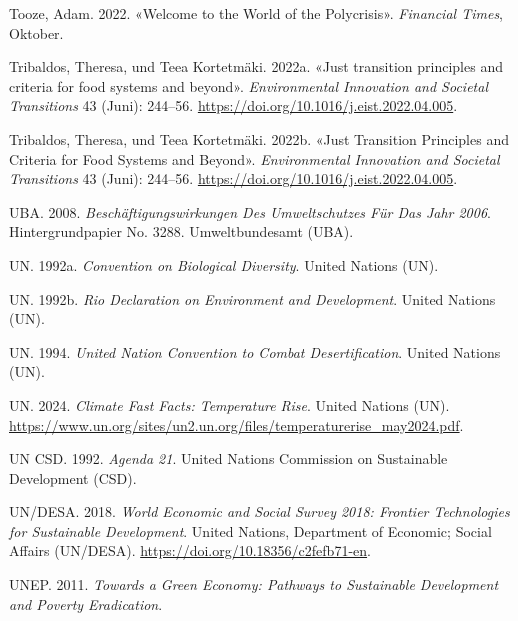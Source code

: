 \documentclass[
  nswissgerman,
  a4paper,
  openany]{book}
\newlength{\cslhangindent}
\newenvironment{CSLReferences}[2] %
 {\begin{list}{}{%
  \setlength{\itemindent}{0pt}
  \setlength{\leftmargin}{0pt}
  \setlength{\parsep}{0pt}
  \ifodd #1
   \setlength{\leftmargin}{\cslhangindent}
   \setlength{\itemindent}{-1\cslhangindent}
  \fi
  \setlength{\itemsep}{#2\baselineskip}}}
 {\end{list}}
\begin{document}
\begin{CSLReferences}{1}{1}
Tooze, Adam. 2022. {«Welcome to the World of the Polycrisis»}.
\emph{Financial Times}, Oktober.

Tribaldos, Theresa, und Teea Kortetmäki. 2022a. {«Just transition
principles and criteria for food systems and beyond»}.
\emph{Environmental Innovation and Societal Transitions} 43 (Juni):
244--56. \url{https://doi.org/10.1016/j.eist.2022.04.005}.

Tribaldos, Theresa, und Teea Kortetmäki. 2022b. {«Just Transition
Principles and Criteria for Food Systems and Beyond»}.
\emph{Environmental Innovation and Societal Transitions} 43 (Juni):
244--56. \url{https://doi.org/10.1016/j.eist.2022.04.005}.

UBA. 2008. \emph{Beschäftigungswirkungen Des {Umweltschutzes} Für Das
{Jahr} 2006}. Hintergrundpapier No. 3288. Umweltbundesamt (UBA).

UN. 1992a. \emph{Convention on {Biological Diversity}}. United Nations
(UN).

UN. 1992b. \emph{Rio {Declaration} on {Environment} and {Development}}.
United Nations (UN).

UN. 1994. \emph{United {Nation Convention} to {Combat Desertification}}.
United Nations (UN).

UN. 2024. \emph{Climate {Fast} {Facts}: {Temperature} {Rise}}. United
Nations (UN).
\url{https://www.un.org/sites/un2.un.org/files/temperaturerise_may2024.pdf}.

UN CSD. 1992. \emph{Agenda 21}. United Nations Commission on Sustainable
Development (CSD).

UN/DESA. 2018. \emph{World {Economic} and {Social} {Survey} 2018:
{Frontier} {Technologies} for {Sustainable} {Development}}. United
Nations, Department of Economic; Social Affairs (UN/DESA).
\url{https://doi.org/10.18356/c2fefb71-en}.

UNEP. 2011. \emph{Towards a {Green Economy}: {Pathways} to {Sustainable
Development} and {Poverty Eradication}}.


\end{CSLReferences}
\end{document}
